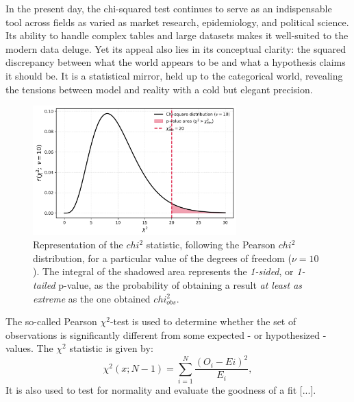 \documentclass{book}
\begin{document}
In the present day, the chi-squared test continues to serve as an indispensable tool across fields as varied as market research, epidemiology, and political science. Its ability to handle complex tables and large datasets makes it well-suited to the modern data deluge. Yet its appeal also lies in its conceptual clarity: the squared discrepancy between what the world appears to be and what a hypothesis claims it should be. It is a statistical mirror, held up to the categorical world, revealing the tensions between model and reality with a cold but elegant precision.\\

\begin{figure}[ht]
    \centering
    \includegraphics[width=0.7\textwidth]{figures/chapter4/chi2_test_one_tailed.png}
    \caption{Representation of the $chi^{2}$ statistic, following the Pearson $chi^{2}$ distribution, for a particular value of the degrees of freedom ($\nu = 10$). The integral of the shadowed area represents the \textit{1-sided}, or \textit{1-tailed} p-value, as the probability of obtaining a result \textit{at least as extreme} as the one obtained $chi^{2}_{obs}$.}
    \label{fig:chi2_test1}
\end{figure}

The so-called Pearson $\chi^{2}$-test is used to determine whether the set of observations is significantly different from some expected - or hypothesized - values. The $\chi^{2}$ statistic is given by:
\[
    \chi^{2}(x; N - 1) = \sum_{i = 1}^{N}\frac{(O_{i} - E{i})^{2}}{E_i},
\]
It is also used to test for normality and evaluate the goodness of a fit [...].\\\
\end{document}
